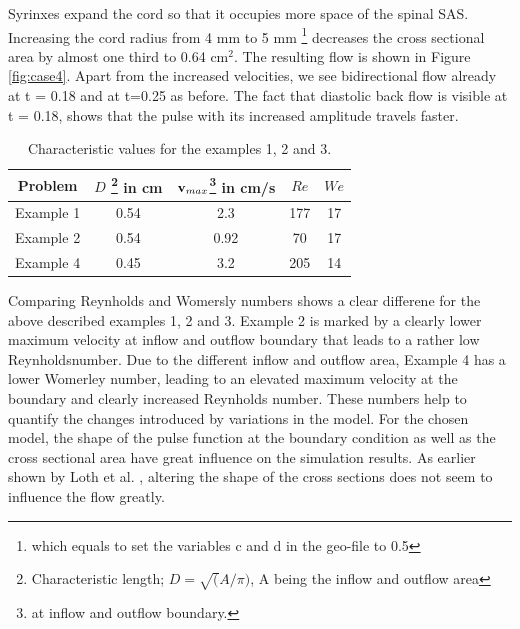 Syrinxes expand the cord so that it occupies more space of the spinal SAS. Increasing the cord radius from 4 mm to 5 mm \footnote{which equals to set the variables c and d in the geo-file to 0.5} decreases the cross sectional area by almost one third to 0.64 $\mathrm{cm^2}$. The resulting flow is shown in Figure \ref{fig:case4}. Apart from the increased velocities, we see bidirectional flow already at t = 0.18 and at t=0.25 as before. The fact that diastolic back flow is visible at t = 0.18, shows that the pulse with its increased amplitude travels faster. 

\begin{table}\begin{center}
    \begin{tabular}{ | c | c | c | c | c |}
    \hline
    Problem & $D$ \footnote{Characteristic length; $D=\sqrt(A/\pi)$, A being the inflow and outflow area} in cm & $\mathbf{v}_{max}$\footnote{at inflow and outflow boundary.} in cm/s  & $Re$ & $We$ \\ \hline\hline
	Example 1 	&	0.54 & 2.3 & 177 & 17	\\ \hline
	Example 2	&	0.54 & 0.92 & 70 & 17	\\ \hline
	Example 4	&	0.45 & 3.2 	& 205 & 14	\\ \hline
    \end{tabular}
	\label{tab:Re_We}
	\caption{Characteristic values for the examples 1, 2 and 3.}
\end{center}\end{table}

Comparing Reynholds and Womersly numbers shows a clear differene for the above described examples 1, 2 and 3. Example 2 is marked by a clearly lower maximum velocity at inflow and outflow boundary that leads to a rather low Reynholdsnumber. Due to the different inflow and outflow area, Example 4 has a lower Womerley number, leading to an elevated maximum velocity at the boundary and clearly increased Reynholds number. These numbers help to quantify the changes introduced by variations in the model. For the chosen model, the shape of the pulse function at the boundary condition as well as the cross sectional area have great influence on the simulation results. As earlier shown by Loth et al. \cite{Loth2001}, altering the shape of the cross sections does not seem to influence the flow greatly.


